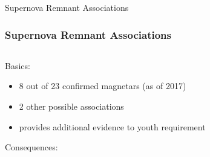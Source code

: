 \documentclass[hyperref=pdftex, presentation]{beamer}
\begin{document}
\begin{frame}{\Large Supernova Remnant Associations}
\frametitle{\Large Supernova Remnant Associations}
	
	\begin{minipage}[0.2\textheight]{\textwidth}
		\begin{columns}[T]
			\begin{column}{0.5\textwidth}
			
				\begin{block}{Basics:}
				
					\begin{itemize}
					 \item<2-> 8 out of 23 confirmed magnetars (as of 2017)  %
					 \item<3-> 2 other possible associations
					 \item<4-> provides additional evidence to youth requirement
					\end{itemize}
				\end{block}
				\begin{block}{Consequences:}
				

\end{block}
\end{column}
\end{columns}
\end{minipage}
\end{frame}
\end{document}
